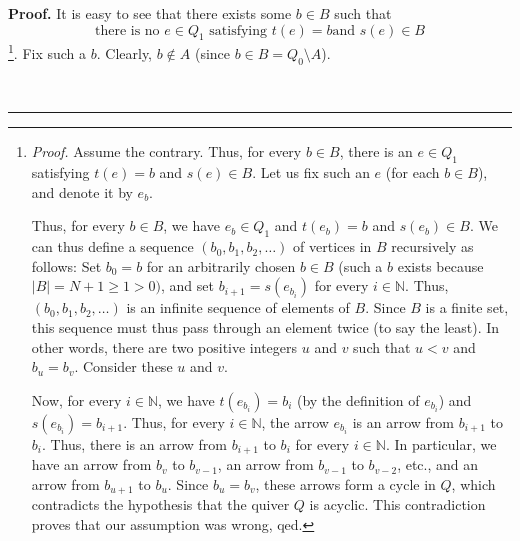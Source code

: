 \documentclass[numbers=enddot,12pt,final,onecolumn,notitlepage]{scrartcl}%
\numberwithin{exer}{section}
\theoremstyle{definition}
\newenvironment{proof}[1][Proof]{\noindent\textbf{#1.} }{\ \rule{0.5em}{0.5em}}
\begin{document}
\begin{proof}
It is easy to see that there exists some $b\in B$ such that%
\begin{equation}
\text{there is no }e\in Q_{1}\text{ satisfying }t\left(  e\right)  =b\text{
and }s\left(  e\right)  \in B \label{sol.ps1.exe.1.1.a.3}%
\end{equation}
\footnote{\textit{Proof.} Assume the contrary. Thus, for every $b\in B$, there
is an $e\in Q_{1}$ satisfying $t\left(  e\right)  =b$ and $s\left(  e\right)
\in B$. Let us fix such an $e$ (for each $b\in B$), and denote it by $e_{b}$.
\par
Thus, for every $b\in B$, we have $e_{b}\in Q_{1}$ and $t\left(  e_{b}\right)
=b$ and $s\left(  e_{b}\right)  \in B$. We can thus define a sequence $\left(
b_{0},b_{1},b_{2},\ldots\right)  $ of vertices in $B$ recursively as follows:
Set $b_{0}=b$ for an arbitrarily chosen $b\in B$ (such a $b$ exists because
$\left\vert B\right\vert =N+1\geq1>0)$, and set $b_{i+1}=s\left(  e_{b_{i}%
}\right)  $ for every $i\in\mathbb{N}$. Thus, $\left(  b_{0},b_{1}%
,b_{2},\ldots\right)  $ is an infinite sequence of elements of $B$. Since $B$
is a finite set, this sequence must thus pass through an element twice (to say
the least). In other words, there are two positive integers $u$ and $v$ such
that $u<v$ and $b_{u}=b_{v}$. Consider these $u$ and $v$.
\par
Now, for every $i\in\mathbb{N}$, we have $t\left(  e_{b_{i}}\right)  =b_{i}$
(by the definition of $e_{b_{i}}$) and $s\left(  e_{b_{i}}\right)  =b_{i+1}$.
Thus, for every $i\in\mathbb{N}$, the arrow $e_{b_{i}}$ is an arrow from
$b_{i+1}$ to $b_{i}$. Thus, there is an arrow from $b_{i+1}$ to $b_{i}$ for
every $i\in\mathbb{N}$. In particular, we have an arrow from $b_{v}$ to
$b_{v-1}$, an arrow from $b_{v-1}$ to $b_{v-2}$, etc., and an arrow from
$b_{u+1}$ to $b_{u}$. Since $b_{u}=b_{v}$, these arrows form a cycle in $Q$,
which contradicts the hypothesis that the quiver $Q$ is acyclic. This
contradiction proves that our assumption was wrong, qed.}. Fix such a $b$.
Clearly, $b\notin A$ (since $b\in B=Q_{0}\setminus A$).


\end{proof}
\end{document}

